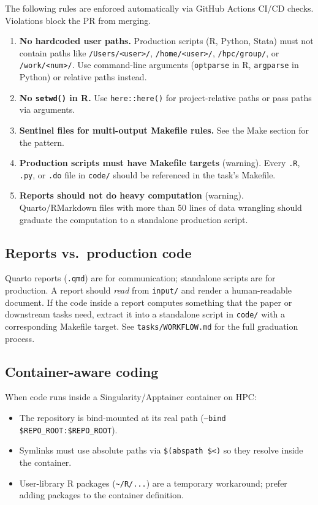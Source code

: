 The following rules are enforced automatically via GitHub Actions CI/CD checks.
Violations block the PR from merging.

\begin{enumerate}
	\item \textbf{No hardcoded user paths.}
	Production scripts (R, Python, Stata) must not contain paths like
	\texttt{/Users/<user>/}, \texttt{/home/<user>/}, \texttt{/hpc/group/}, or \texttt{/work/<num>/}.
	Use command-line arguments (\texttt{optparse} in R, \texttt{argparse} in Python)
	or relative paths instead.
	\item \textbf{No \texttt{setwd()} in R.}
	Use \texttt{here::here()} for project-relative paths or pass paths via arguments.
	\item \textbf{Sentinel files for multi-output Makefile rules.}
	See the Make section for the pattern.
	\item \textbf{Production scripts must have Makefile targets} (warning).
	Every \texttt{.R}, \texttt{.py}, or \texttt{.do} file in \texttt{code/} should be referenced
	in the task's Makefile.
	\item \textbf{Reports should not do heavy computation} (warning).
	Quarto/RMarkdown files with more than 50 lines of data wrangling should graduate
	the computation to a standalone production script.
\end{enumerate}

\subsection{Reports vs.\ production code}

Quarto reports (\texttt{.qmd}) are for communication; standalone scripts are for production.
A report should \emph{read} from \texttt{input/} and render a human-readable document.
If the code inside a report computes something that the paper or downstream tasks need,
extract it into a standalone script in \texttt{code/} with a corresponding Makefile target.
See \texttt{tasks/WORKFLOW.md} for the full graduation process.

\subsection{Container-aware coding}

When code runs inside a Singularity/Apptainer container on HPC:
\begin{itemize}
	\item The repository is bind-mounted at its real path (\texttt{--bind \$REPO\_ROOT:\$REPO\_ROOT}).
	\item Symlinks must use absolute paths via \texttt{\$(abspath \$<)} so they resolve inside the container.
	\item User-library R packages (\texttt{\textasciitilde/R/...}) are a temporary workaround; prefer adding packages to the container definition.
\end{itemize}

